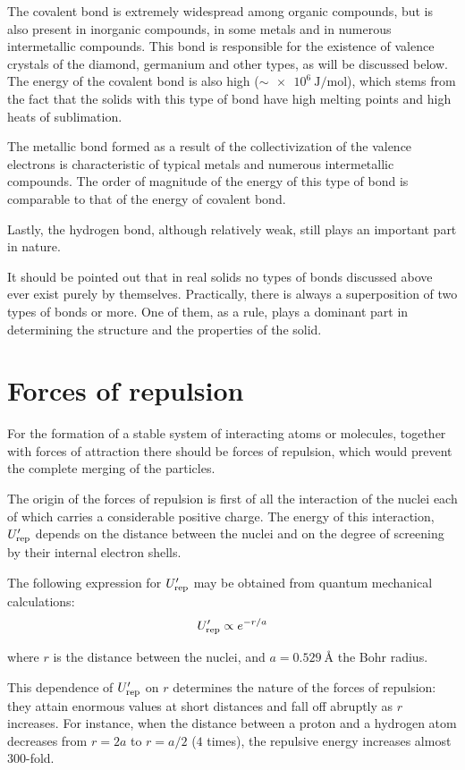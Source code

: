 The covalent bond is extremely widespread among organic compounds, but is also present in inorganic compounds, in some metals and in numerous intermetallic compounds. This bond is responsible for the existence of valence crystals of the diamond, germanium and other types, as will be discussed below. The energy of the covalent bond is also high ($\sim\!\SI{e6}{\joule\per\mole}$), which stems from the fact that the solids with this type of bond have high melting points and high heats of sublimation.

The metallic bond formed as a result of the collectivization of the valence electrons is characteristic of typical metals and numerous intermetallic compounds. The order of magnitude of the energy of this type of bond is comparable to that of the energy of covalent bond.

Lastly, the hydrogen bond, although relatively weak, still plays an important part in nature.

It should be pointed out that in real solids no types of bonds discussed above ever exist purely by themselves. Practically, there is always a superposition of two types of bonds or more. One of them, as a rule, plays a dominant part in determining the structure and the properties of the solid.

\section{Forces of repulsion}\label{sec:1_7}

For the formation of a stable system of interacting atoms or molecules, together with forces of attraction there should be forces of repulsion, which would prevent the complete merging of the particles.

The origin of the forces of repulsion is first of all the interaction of the nuclei each of which carries a considerable positive charge. The energy of this interaction, $U_{\text{rep}}'$ depends on the distance between the nuclei and on the degree of screening by their internal electron shells.

The following expression for $U_{\text{rep}}'$ may be obtained from quantum mechanical calculations:
\begin{equation}\label{eq:1_14}
	U_{\text{rep}}' \propto e^{-r/a}
\end{equation}

\noindent
where $r$ is the distance between the nuclei, and $a=\SI{0.529}{\angstrom}$ the Bohr radius.

This dependence of $U_{\text{rep}}'$ on $r$ determines the nature of the forces of repulsion: they attain enormous values at short distances and
fall off abruptly as $r$ increases. For instance, when the distance between a proton and a hydrogen atom decreases from $r=2a$ to $r=a/2$ ($4$ times), the repulsive energy increases almost $300$-fold.

